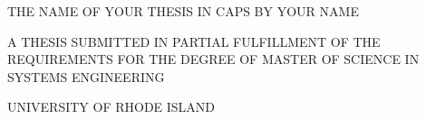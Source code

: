 \clearpage\thispagestyle{empty}
\begin{center}
	THE NAME OF YOUR THESIS IN CAPS \break
	BY \break	
	YOUR NAME
	\begin{midpar}
		A THESIS SUBMITTED IN PARTIAL FULFILLMENT OF THE \break
		REQUIREMENTS FOR THE DEGREE OF \break 
		MASTER OF SCIENCE \break
		IN \break
		SYSTEMS ENGINEERING \break
	\end{midpar}
	
	\begin{bottompar}
		UNIVERSITY OF RHODE ISLAND 
	\end{bottompar}
\end{center}